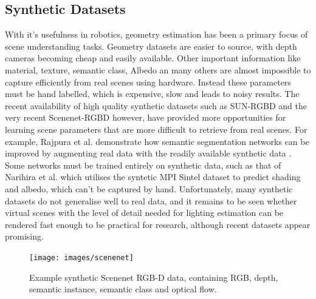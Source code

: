 \documentclass[ %
                    author={Gavin Parker},
                supervisor={Dr. Neill Campbell},
                    degree={MEng},
                     title={Deep Siamese Networks for Illumination Estimation from Stereo Images},
                  subtitle={},
                      type={Research},
                      year={2018} ]{dissertation}
\begin{document}
\subsection{Synthetic Datasets}
With it's usefulness in robotics, geometry estimation has been a primary focus of scene understanding tasks. Geometry datasets are easier to source, with depth cameras becoming cheap and easily available. Other important information like material, texture, semantic class, Albedo an many others are almost impossible to capture efficiently from real scenes using hardware. Instead these parameters must be hand labelled, which is expensive, slow and leads to noisy results. The recent availability of high quality synthetic datasets such as SUN-RGBD \cite{song2015sun} and the very recent Scenenet-RGBD \cite{McCormac:etal:arXiv2016} however, have provided more opportunities for learning scene parameters that are more difficult to retrieve from real scenes. For example, Rajpura et al. demonstrate how semantic segmentation networks can be improved by augmenting real data with the readily available synthetic data \cite{DBLP:journals/corr/abs-1709-00849}. Some networks must be trained entirely on synthetic data, such as that of Narihira et al. which utilises the syntetic MPI Sintel dataset to predict shading and albedo, which can't be captured by hand. Unfortunately, many synthetic datasets do not generalise well to real data, and it remains to be seen whether virtual scenes with the level of detail needed for lighting estimation can be rendered fast enough to be practical for research, although recent datasets appear promising.
\begin{figure}[H]
\centering
\texttt{[image: images/scenenet]}
\caption{Example synthetic Scenenet RGB-D data, containing RGB, depth, semantic instance, semantic class and optical flow.}
\end{figure}
\end{document}

